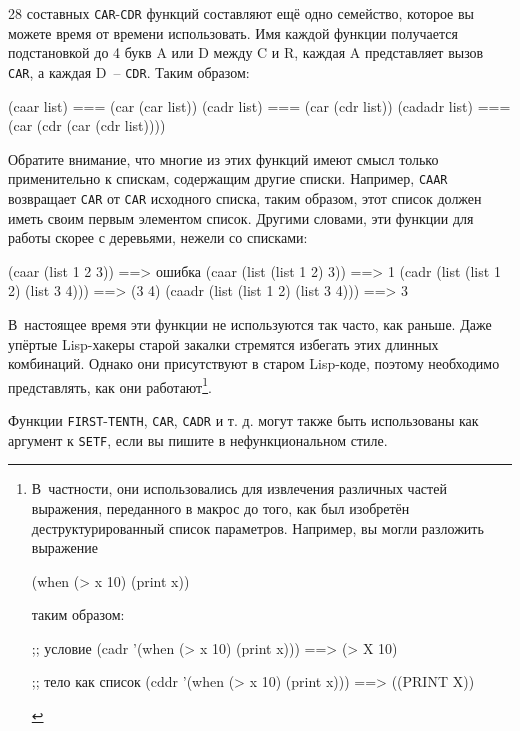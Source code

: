28 составных \lstinline{CAR}-\lstinline{CDR} функций составляют ещё одно семейство, которое вы можете время
от времени использовать. Имя каждой функции получается подстановкой до 4 букв A или D
между C и R, каждая A представляет вызов \lstinline{CAR}, а каждая D~-- \lstinline{CDR}. Таким
образом:

\begin{myverb}
(caar list)   === (car (car list))
(cadr list)   === (car (cdr list))
(cadadr list) === (car (cdr (car (cdr list))))
\end{myverb}

Обратите внимание, что многие из этих функций имеют смысл только применительно к спискам,
содержащим другие списки. Например, \lstinline{CAAR} возвращает \lstinline{CAR} от \lstinline{CAR}
исходного списка, таким образом, этот список должен иметь своим первым элементом
список. Другими словами, эти функции для работы скорее с деревьями, нежели со списками:

\begin{myverb}
(caar (list 1 2 3))                  ==> ошибка
(caar (list (list 1 2) 3))           ==> 1
(cadr (list (list 1 2) (list 3 4)))  ==> (3 4)
(caadr (list (list 1 2) (list 3 4))) ==> 3
\end{myverb}

В~настоящее время эти функции не используются так часто, как раньше. Даже упёртые
Lisp-хакеры старой закалки стремятся избегать этих длинных комбинаций. Однако они
присутствуют в старом Lisp-коде, поэтому необходимо представлять, как они
работают\footnote{В~частности, они использовались для извлечения различных частей
  выражения, переданного в макрос до того, как был изобретён деструктурированный список
  параметров. Например, вы могли разложить выражение

\begin{myverb}
(when (> x 10) (print x))
\end{myverb}

\noindent{}таким образом:

\begin{myverb}
;; условие
(cadr '(when (> x 10) (print x))) ==> (> X 10)

;; тело как список
(cddr '(when (> x 10) (print x))) ==> ((PRINT X))
\end{myverb}
}\hspace{\footnotenegspace}.

Функции \lstinline{FIRST}-\lstinline{TENTH}, \lstinline{CAR}, \lstinline{CADR} и т. д. могут также быть
использованы как аргумент к \lstinline{SETF}, если вы пишите в нефункциональном стиле.

